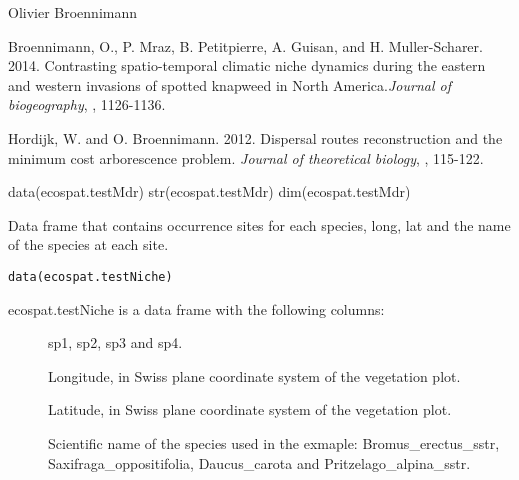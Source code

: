 \documentclass[a4paper]{book}
\begin{document}
%
\begin{Author}\relax
Olivier Broennimann 
\end{Author}
%
\begin{References}\relax
Broennimann, O., P. Mraz, B. Petitpierre, A. Guisan, and H. Muller-Scharer. 2014. Contrasting spatio-temporal climatic niche dynamics during the eastern and western invasions of spotted knapweed in North America.\emph{Journal of biogeography}, , 1126-1136.

Hordijk, W. and O. Broennimann. 2012. Dispersal routes reconstruction and the minimum cost arborescence problem. \emph{Journal of theoretical biology}, , 115-122.
\end{References}
%
\begin{Examples}
\begin{ExampleCode}
data(ecospat.testMdr)
str(ecospat.testMdr)
dim(ecospat.testMdr)
\end{ExampleCode}
\end{Examples}
%
\begin{Description}\relax
Data frame that contains occurrence sites for each species, long, lat and the name of the species at each site.
\end{Description}
%
\begin{Usage}
\begin{verbatim}
data(ecospat.testNiche)
\end{verbatim}
\end{Usage}
%
\begin{Format}
ecospat.testNiche is a data frame with the following columns:
\begin{description}

\item[] sp1, sp2, sp3 and sp4.
\item[] Longitude, in Swiss plane coordinate system of the vegetation plot.
\item[] Latitude, in Swiss plane coordinate system of the vegetation plot.
\item[] Scientific name of the species used in the exmaple: Bromus\_erectus\_sstr, Saxifraga\_oppositifolia, Daucus\_carota and Pritzelago\_alpina\_sstr.

\end{description}

\end{Format}
\end{document}
